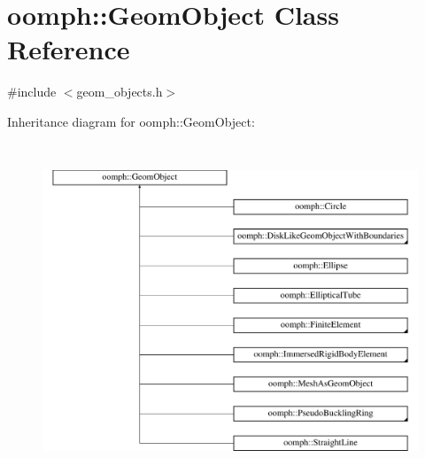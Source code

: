 \hypertarget{classoomph_1_1GeomObject}{}\section{oomph\+:\+:Geom\+Object Class Reference}
\label{classoomph_1_1GeomObject}


{\ttfamily \#include $<$geom\+\_\+objects.\+h$>$}

Inheritance diagram for oomph\+:\+:Geom\+Object\+:\begin{figure}[H]
\begin{center}
\leavevmode
\includegraphics[height=10.000000cm]{classoomph_1_1GeomObject}
\end{center}
\end{figure}
